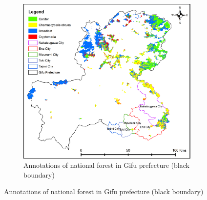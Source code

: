 \begin{figure}[p]
    \centering
    \begin{subfigure}{\textwidth}
        \centering
        \includegraphics[width=\textwidth]{figs/chap5/studyarea.png}
        \caption{Annotations of national forest in Gifu prefecture (black boundary)}
        \label{fig:chap5_studyarea}
    \end{subfigure}


\end{figure}
